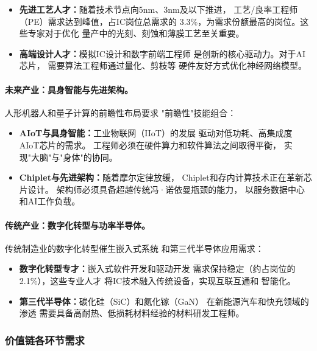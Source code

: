 \documentclass[12pt,a4paper]{article}
\begin{document}
\begin{itemize}
    \item \textbf{先进工艺人才：}随着技术节点向5nm、3nm及以下推进，
          工艺/良率工程师（PE）需求达到峰值，占IC岗位总需求的
          3.3\%，为需求份额最高的岗位。这些专家对于优化
          量产中的光刻、刻蚀和薄膜工艺至关重要。
    \item \textbf{高端设计人才：}模拟IC设计和数字前端工程师
          是创新的核心驱动力。对于AI芯片，
          需要算法工程师通过量化、剪枝等
          硬件友好方式优化神经网络模型。
\end{itemize}

\paragraph{未来产业：具身智能与先进架构。}
人形机器人和量子计算的前瞻性布局要求
"前瞻性"技能组合：

\begin{itemize}
    \item \textbf{AIoT与具身智能：}工业物联网（IIoT）的发展
          驱动对低功耗、高集成度AIoT芯片的需求。
          工程师必须在硬件算力和软件算法之间取得平衡，
          实现"大脑"与"身体"的协同。
    \item \textbf{Chiplet与先进架构：}随着摩尔定律放缓，
          Chiplet和存内计算技术正在革新芯片设计。
          架构师必须具备超越传统冯·诺依曼瓶颈的能力，
          以服务数据中心和AI工作负载。
\end{itemize}

\paragraph{传统产业：数字化转型与功率半导体。}
传统制造业的数字化转型催生嵌入式系统
和第三代半导体应用需求：

\begin{itemize}
    \item \textbf{数字化转型专才：}嵌入式软件开发和驱动开发
          需求保持稳定（约占岗位的2.1\%），这些专业人才
          将IC技术融入传统设备，实现互联互通和
          智能化。
    \item \textbf{第三代半导体：}碳化硅（SiC）和氮化镓（GaN）
          在新能源汽车和快充领域的渗透
          需要具备高耐热、低损耗材料经验的材料研发工程师。
\end{itemize}

\subsubsection{价值链各环节需求}
\end{document}
